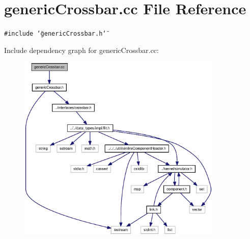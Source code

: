 \section{genericCrossbar.cc File Reference}
\label{genericCrossbar_8cc}
{\tt \#include \char`\"{}genericCrossbar.h\char`\"{}}\par


Include dependency graph for genericCrossbar.cc:\nopagebreak
\begin{figure}[H]
\begin{center}
\leavevmode
\includegraphics[width=277pt]{genericCrossbar_8cc__incl}
\end{center}
\end{figure}
